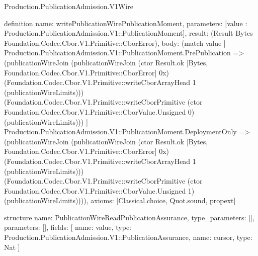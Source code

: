 \begin{lexlean}{Production.PublicationAdmission.V1Wire}
\begin{semanticmodule}
definition{
  name: writePublicationWirePublicationMoment,
  parameters: [value : Production.PublicationAdmission.V1::PublicationMoment],
  result: (Result Bytes Foundation.Codec.Cbor.V1.Primitive::CborError),
  body: (match value
    | Production.PublicationAdmission.V1::PublicationMoment.PrePublication => (publicationWireJoin (publicationWireJoin (ctor Result.ok [Bytes, Foundation.Codec.Cbor.V1.Primitive::CborError] 0x) (Foundation.Codec.Cbor.V1.Primitive::writeCborArrayHead 1 (publicationWireLimits))) (Foundation.Codec.Cbor.V1.Primitive::writeCborPrimitive (ctor Foundation.Codec.Cbor.V1.Primitive::CborValue.Unsigned 0) (publicationWireLimits)))
    | Production.PublicationAdmission.V1::PublicationMoment.DeploymentOnly => (publicationWireJoin (publicationWireJoin (ctor Result.ok [Bytes, Foundation.Codec.Cbor.V1.Primitive::CborError] 0x) (Foundation.Codec.Cbor.V1.Primitive::writeCborArrayHead 1 (publicationWireLimits))) (Foundation.Codec.Cbor.V1.Primitive::writeCborPrimitive (ctor Foundation.Codec.Cbor.V1.Primitive::CborValue.Unsigned 1) (publicationWireLimits)))),
  axioms: [Classical.choice, Quot.sound, propext]
}

structure{
  name: PublicationWireReadPublicationAssurance,
  type_parameters: [],
  parameters: [],
  fields: [
    {name: value, type: Production.PublicationAdmission.V1::PublicationAssurance},
    {name: cursor, type: Nat}
  ]
}


\end{semanticmodule}
\end{lexlean}
